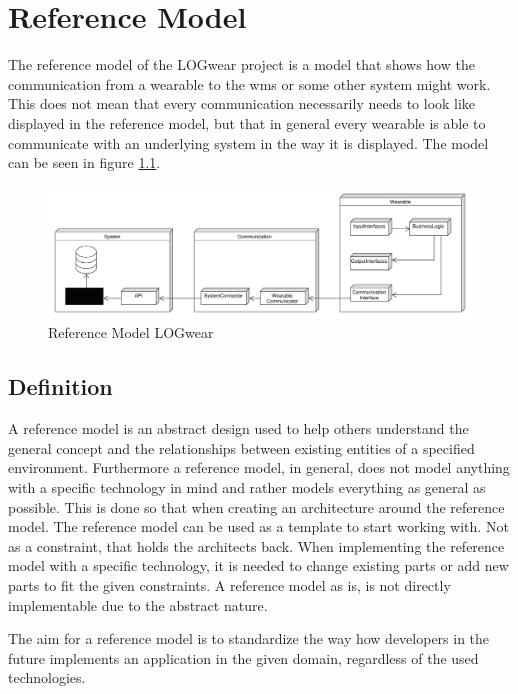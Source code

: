 \chapter{Reference Model}\label{cha:reference}
The \gls{reference model} of the LOGwear project is a model that shows how the communication from a wearable to the \gls{wms} or some other system might work. This does not mean that every communication necessarily needs to look like displayed in the \gls{reference model}, but that in general every wearable is able to communicate with an underlying system in the way it is displayed.
The model can be seen in figure \ref{fig:referenceModel}.
\begin{figure}[htbp]
	\includegraphics[width=\linewidth]{images/PackageModel_ReferenceArchitecture}
	\caption{Reference Model LOGwear}
	\label{fig:referenceModel}
\end{figure}

\section{Definition}
A \gls{reference model} is an abstract design used to help others understand the general concept and the relationships between existing entities of a specified environment. Furthermore a \gls{reference model}, in general, does not model anything with a specific technology in mind and rather models everything as general as possible. This is done so that when creating an architecture around the \gls{reference model}. The \gls{reference model} can be used as a template to start working with. Not as a constraint, that holds the architects back. When implementing the \gls{reference model} with a specific technology, it is needed to change existing parts or add new parts to fit the given constraints. A \gls{reference model} as is, is not directly implementable due to the abstract nature.

The aim for a \gls{reference model} is to standardize the way how developers in the future implements an application in the given domain, regardless of the used technologies.\citep{website:oasis-rm}

